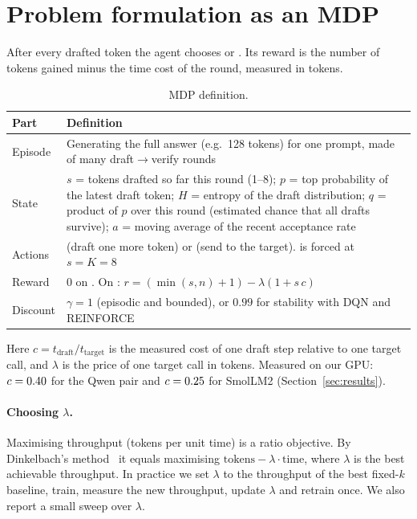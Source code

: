 \section{Problem formulation as an MDP}
\label{sec:mdp}

After every drafted token the agent chooses \CONT{} or \STOP{}. Its reward is the number of tokens gained minus the time cost of the round, measured in tokens.

\begin{table}[h]
\centering
\caption{MDP definition.}
\label{tab:mdp}
\begin{tabularx}{\linewidth}{@{}lX@{}}
\toprule
Part & Definition \\
\midrule
Episode & Generating the full answer (e.g.\ 128 tokens) for one prompt, made of many draft$\to$verify rounds \\
State & $s$ = tokens drafted so far this round (1--8); $p$ = top probability of the latest draft token; $H$ = entropy of the draft distribution; $q$ = product of $p$ over this round (estimated chance that all drafts survive); $a$ = moving average of the recent acceptance rate \\
Actions & \CONT{} (draft one more token) or \STOP{} (send to the target). \STOP{} is forced at $s = K = 8$ \\
Reward & 0 on \CONT{}. On \STOP{}: $r = (\min(s,n)+1) - \lambda(1 + s\,c)$ \\
Discount & $\gamma = 1$ (episodic and bounded), or $0.99$ for stability with DQN and REINFORCE \\
\bottomrule
\end{tabularx}
\end{table}

Here $c = t_\text{draft} / t_\text{target}$ is the measured cost of one draft step relative to one target call, and $\lambda$ is the price of one target call in tokens. Measured on our GPU: $c=0.40$ for the Qwen pair and $c=0.25$ for SmolLM2 (Section~\ref{sec:results}).

\paragraph{Choosing $\lambda$.} Maximising throughput (tokens per unit time) is a ratio objective. By Dinkelbach's method~\citep{dinkelbach1967} it equals maximising $\text{tokens} - \lambda\cdot\text{time}$, where $\lambda$ is the best achievable throughput. In practice we set $\lambda$ to the throughput of the best fixed-$k$ baseline, train, measure the new throughput, update $\lambda$ and retrain once. We also report a small sweep over $\lambda$.

